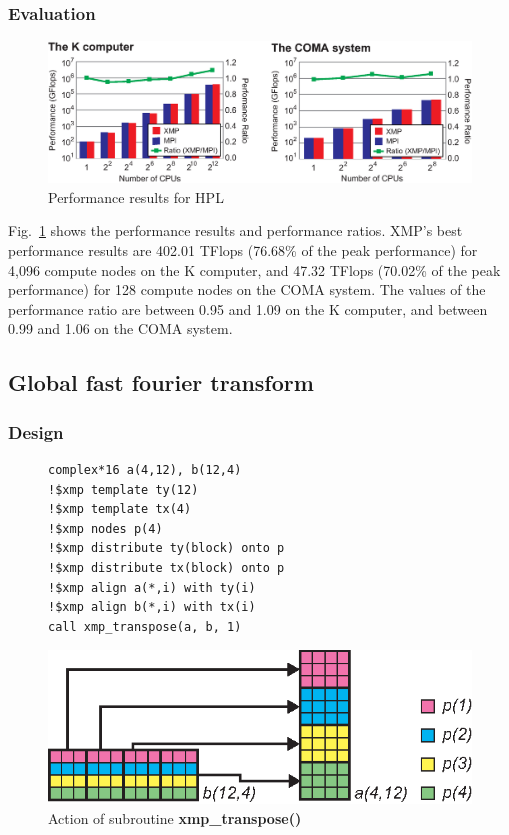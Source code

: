 \documentclass[graybox]{svmult}
\begin{document}
\subsubsection{Evaluation}
\begin{figure}[h]
\sidecaption
\includegraphics[scale=0.4,clip]{img/result-hpl.eps}
\caption{Performance results for HPL\cite{hpca}}\label{fig:result-hpl}
\end{figure}

Fig.~\ref{fig:result-hpl} shows the performance results and performance ratios.
XMP's best performance results are 402.01 TFlops (76.68\% of the peak performance) for 4,096 compute nodes on the K computer,
and 47.32 TFlops (70.02\% of the peak performance) for 128 compute nodes on the COMA system.
The values of the performance ratio are between 0.95 and 1.09 on the K computer,
and between 0.99 and 1.06 on the COMA system.

\subsection{Global fast fourier transform}
\subsubsection{Design}
\begin{figure}[h]
\begin{lstlisting}
complex*16 a(4,12), b(12,4)
!$xmp template ty(12)
!$xmp template tx(4)
!$xmp nodes p(4)
!$xmp distribute ty(block) onto p
!$xmp distribute tx(block) onto p
!$xmp align a(*,i) with ty(i)
!$xmp align b(*,i) with tx(i)
call xmp_transpose(a, b, 1)
\end{lstlisting}
%
\begin{center}
\includegraphics[scale=1.1,clip]{img/transpose.eps}
\caption{Action of subroutine {\bf xmp\_transpose()}\cite{hpca}}\label{fig:transpose}
\end{center}
\end{figure}
\end{document}
